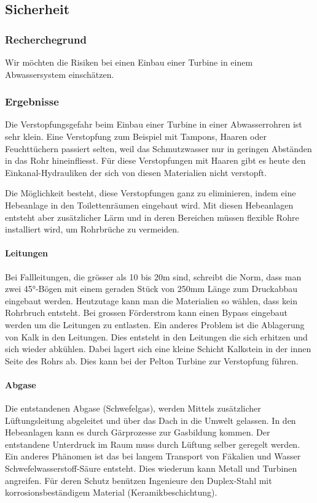 \subsection{Sicherheit}


\subsubsection{Recherchegrund}
Wir möchten die Risiken bei einen Einbau einer Turbine in einem Abwassersystem  einschätzen.

\subsubsection{Ergebnisse}
Die Verstopfungsgefahr beim Einbau einer Turbine in einer Abwasserrohren ist sehr klein. 
Eine Verstopfung zum Beispiel mit Tampons, Haaren oder Feuchttüchern passiert selten, weil das Schmutzwasser nur in geringen Abständen in das Rohr hineinfliesst. 
Für diese Verstopfungen mit Haaren gibt es heute den Einkanal-Hydrauliken der sich von diesen Materialien nicht verstopft.\cite{Homa-Pumpen}

Die Möglichkeit besteht, diese Verstopfungen ganz zu eliminieren, indem eine Hebeanlage in den Toilettenräumen eingebaut wird. Mit diesen Hebeanlagen entsteht aber zusätzlicher Lärm und in deren Bereichen müssen flexible Rohre installiert wird, um Rohrbrüche zu vermeiden. \cite{Hebeanlagen,Tipp zum Bau}
\paragraph{Leitungen}
Bei Fallleitungen, die grösser als 10 bis 20\si{m} sind, schreibt die Norm, dass man zwei 45°-Bögen mit einem geraden Stück von 250\si{mm} Länge zum Druckabbau eingebaut werden. Heutzutage kann man die Materialien so wählen, dass kein Rohrbruch entsteht. Bei grossen Förderstrom kann einen Bypass eingebaut werden um die Leitungen zu entlasten. 
Ein anderes Problem ist die Ablagerung von Kalk in den Leitungen. Dies entsteht in den Leitungen die sich erhitzen und sich wieder abkühlen. Dabei lagert sich eine kleine Schicht Kalkstein in der innen Seite des Rohrs ab. Dies kann bei der Pelton Turbine zur Verstopfung führen. \cite{BauNetz Media,Mediagon,Kreiselpumpenlexikon}
\paragraph{Abgase}
Die entstandenen Abgase (Schwefelgas), werden Mittels zusätzlicher Lüftungsleitung abgeleitet und über das Dach in die Umwelt gelassen. In den Hebeanlagen kann es durch Gärprozesse zur Gasbildung kommen. Der entstandene Unterdruck im Raum muss durch Lüftung selber geregelt werden. 
Ein anderes Phänomen ist das bei langem Transport von Fäkalien und Wasser Schwefelwasserstoff-Säure entsteht. Dies wiederum kann Metall und Turbinen angreifen. Für deren Schutz benützen Ingenieure den Duplex-Stahl mit korrosionsbeständigem Material (Keramikbeschichtung).\cite{Water & Wastewater}





